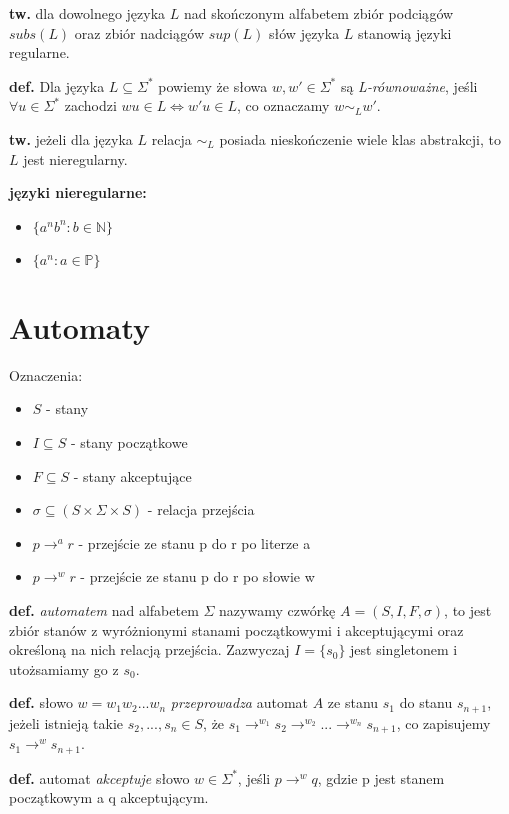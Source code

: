\documentclass{article}
\begin{document}
	\textbf{tw.} dla dowolnego języka $L$ nad skończonym alfabetem zbiór podciągów $subs(L)$ oraz zbiór nadciągów $sup(L)$ słów języka $L$ stanowią języki regularne.
	
	\textbf{def.} Dla języka $L \subseteq \Sigma^*$ powiemy że słowa $w,w' \in \Sigma^*$ są \textit{L-równoważne}, jeśli $\forall u \in \Sigma^*$ zachodzi $wu \in L \iff w'u \in L$, co oznaczamy $w \sim_L w'$.
	
	\textbf{tw.} jeżeli dla języka $L$ relacja $\sim_L$ posiada nieskończenie wiele klas abstrakcji, to $L$ jest nieregularny.
	
	\textbf{języki nieregularne:}
		\begin{itemize}
			\item $\{a^n b^n : b \in \mathbb{N}\}$
			\item $\{a^n : a \in \mathbb{P}\}$
		\end{itemize}
	
\section{Automaty}
	Oznaczenia:
		\begin{itemize}
			\item $S$ - stany
			\item $I \subseteq S$ - stany początkowe
			\item $F \subseteq S$ - stany akceptujące
			\item $\sigma \subseteq (S \times \Sigma \times S)$ - relacja przejścia
			\item $p \rightarrow^a r$ - przejście ze stanu p do r po literze a 
			\item $p \rightarrow^w r$ - przejście ze stanu p do r po słowie w
		\end{itemize}
	
	\textbf{	def.}  \textit{automatem} nad alfabetem $\Sigma$ nazywamy czwórkę $A = (S, I, F, \sigma)$, to jest zbiór stanów z wyróżnionymi stanami początkowymi i akceptującymi oraz określoną na nich relacją przejścia. Zazwyczaj $I = \{s_0\}$ jest singletonem i utożsamiamy go z $s_0$.
	
	\textbf{def.} słowo $w = w_1 w_2 ... w_n$ \textit{przeprowadza} automat $A$ ze stanu $s_1$ do stanu $s_{n+1}$, jeżeli istnieją takie $s_2,..., s_n \in S$, że $s_1 \rightarrow^{w_1} s_2 \rightarrow^{w_2} ... \rightarrow^{w_n} s_{n+1}$, co zapisujemy $s_1 \rightarrow^w s_{n+1}$.
	
	\textbf{def.} automat \textit{akceptuje} słowo $w \in \Sigma^*$, jeśli $p \rightarrow^w q$, gdzie p jest stanem początkowym a q akceptującym.
	
\end{document}
